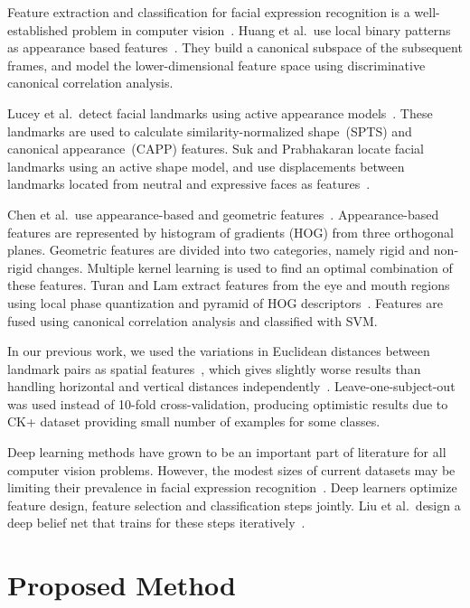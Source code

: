 \documentclass[hyperfootnotes=false]{article}
\begin{document}
Feature extraction and classification for facial expression recognition is a well-established problem in computer vision~\cite{Pantic:2000,Fasel:2003}.
Huang et al.\ use local binary patterns as appearance based features~\cite{Huang:2014}.
They build a canonical subspace of the subsequent frames, and model the lower-dimensional feature space using discriminative canonical correlation analysis.

Lucey et al.\ detect facial landmarks using active appearance models~\cite{Lucey:2010}.
These landmarks are used to calculate similarity-normalized shape~(SPTS) and canonical appearance~(CAPP) features.
Suk and Prabhakaran locate facial landmarks using an active shape model, and use displacements between landmarks located from neutral and expressive faces as features~\cite{Suk:2014}.

Chen et al.\ use appearance-based and geometric features~\cite{Chen:2015}.
Appearance-based features are represented by histogram of gradients (HOG) from three orthogonal planes. 
Geometric features are divided into two categories, namely rigid and non-rigid changes.
Multiple kernel learning is used to find an optimal combination of these features.
Turan and Lam extract features from the eye and mouth regions using local phase quantization and pyramid of HOG descriptors~\cite{Turan:2014}.
Features are fused using canonical correlation analysis and classified with SVM.

In our previous work, we used the variations in Euclidean distances between landmark pairs as spatial features~\cite{Gacav:2016}, which gives slightly worse results than handling horizontal and vertical distances independently~\cite{Lucey:2010}.
Leave-one-subject-out was used instead of 10-fold cross-validation, producing optimistic results due to CK+ dataset providing small number of examples for some classes.

Deep learning methods have grown to be an important part of literature for all computer vision problems.
However, the modest sizes of current datasets may be limiting their prevalence in facial expression recognition~\cite{Lucey:2010,Lyons:1998}.
Deep learners optimize feature design, feature selection and classification steps jointly.
Liu et al.\ design a deep belief net that trains for these steps iteratively~\cite{Liu:2014}.

\section{Proposed Method}
\end{document}
